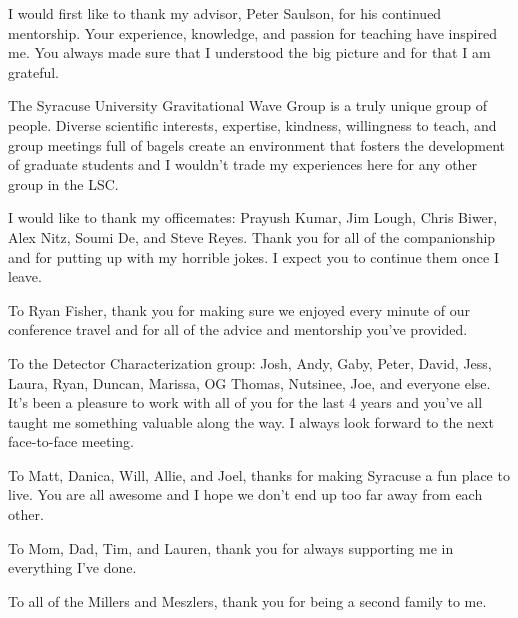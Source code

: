I would first like to thank my advisor, Peter Saulson, for his continued mentorship. Your experience, knowledge, 
and passion for teaching have inspired me. You always made sure that I understood the big picture and 
for that I am grateful.  

The Syracuse University Gravitational Wave Group is a truly unique group of people. Diverse scientific interests, 
expertise, kindness, willingness to teach, and group meetings full of bagels create an environment that fosters 
the development of graduate students and I wouldn't trade my experiences here for any other group in the LSC. 

I would like to thank my officemates: Prayush Kumar, Jim Lough, Chris Biwer, Alex Nitz, Soumi De, and Steve Reyes. 
Thank you for all of the companionship and for putting up with my horrible jokes. I expect you to continue them 
once I leave. 

To Ryan Fisher, thank you for making sure we enjoyed every minute of our conference travel and for all of the 
advice and mentorship you've provided. 

To the Detector Characterization group: Josh, Andy, Gaby, Peter, David, Jess, Laura, Ryan, Duncan, Marissa, 
OG Thomas, Nutsinee, Joe, and everyone else. It's been a pleasure to work with all of you for the last 
4 years and you've 
all taught me something valuable along the way. I always look forward to the next face-to-face meeting.

To Matt, Danica, Will, Allie, and Joel, thanks for making Syracuse a fun place to live. You are all awesome and 
I hope we don't end up too far away from each other. 

To Mom, Dad, Tim, and Lauren, thank you for always supporting me in everything I've done. 

To all of the Millers and Meszlers, thank you for being a second family to me.  


